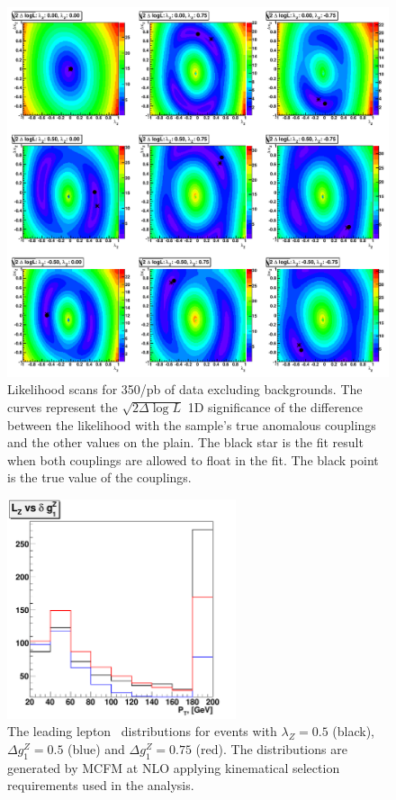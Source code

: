 \begin{figure}[tp]
  \centerline{
    \includegraphics[width=1.0\textwidth]{figures/validation_likelihood_scans}
  }

  \caption[Likelihood scan for Signal Monte Carlo] {Likelihood scans
    for 350/pb of data excluding backgrounds. The curves
    represent the $\sqrt{2\Delta\log L}$ 1D significance of the difference between the
    likelihood with the sample's true anomalous couplings and the other
    values on the plain. The black star is the fit result when both couplings are
    allowed to float in the fit. The black point is the true value of the couplings.}
  \label{fig:val_scans}
\end{figure}

\begin{figure}[tp]
  \centerline{
    \includegraphics[width=0.6\textwidth]{figures/lz_vs_dkg}
  }

  \caption[Leading lepton pt shape for different couplings]{The
  leading lepton \pt\ distributions for events with $\lambda_{Z}=0.5$
  (black), $\Delta g^Z_1=0.5$ (blue) and $\Delta g^Z_1=0.75$
  (red). The distributions are generated by MCFM at NLO applying
  kinematical selection requirements used in the analysis.} \label{fig:lz_vs_dkg}
\end{figure}

